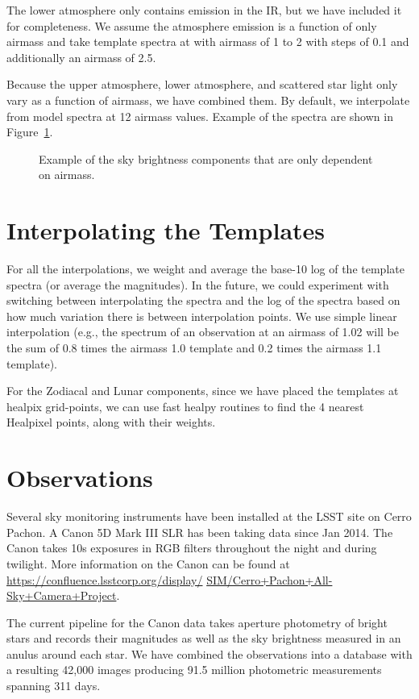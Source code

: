 \documentclass{emulateapj}  %
\begin{document}
The lower atmosphere only contains emission in the IR, but we have included it for completeness.  We assume the atmosphere emission is a function of only airmass and take template spectra at with airmass of 1 to 2 with steps of 0.1 and additionally an airmass of 2.5.

Because the upper atmosphere, lower atmosphere, and scattered star light only vary as a function of airmass, we have combined them. By default, we interpolate from model spectra at 12 airmass values.  Example of the spectra are shown in Figure~\ref{fig:merged}.


\begin{figure}
  \caption{Example of the sky brightness components that are only dependent on airmass.  \label{fig:merged}}
\end{figure}


\section{Interpolating the Templates}

For all the interpolations, we weight and average the base-10 log of the template spectra (or average the magnitudes).  In the future, we could experiment with switching between interpolating the spectra and the log of the spectra based on how much variation there is between interpolation points.  We use simple linear interpolation (e.g., the spectrum of an observation at an airmass of 1.02 will be the sum of 0.8 times the airmass 1.0 template and 0.2 times the airmass 1.1 template). 

For the Zodiacal and Lunar components, since we have placed the templates at healpix grid-points, we can use fast healpy routines to find the 4 nearest Healpixel points, along with their weights.  


\section{Observations}

Several sky monitoring instruments have been installed at the LSST site on Cerro Pachon.  A Canon 5D Mark III SLR has been taking data since Jan 2014.  The Canon takes 10s exposures in RGB filters throughout the night and during twilight.  More information on the Canon can be found at \url{https://confluence.lsstcorp.org/display/} \url{SIM/Cerro+Pachon+All-Sky+Camera+Project}.

The current pipeline for the Canon data takes aperture photometry of bright stars and records their magnitudes as well as the sky brightness measured in an anulus around each star.  We have combined the observations into a database with a resulting 42,000 images producing 91.5 million photometric measurements spanning 311 days.  
\end{document}
